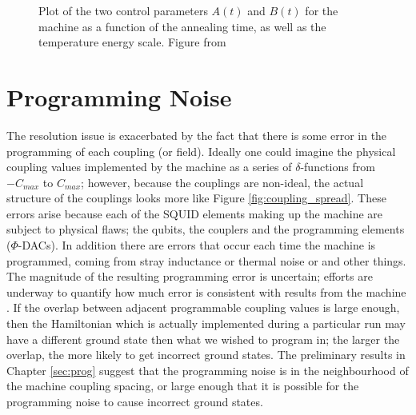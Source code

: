 \begin{figure}
	\caption[\machine Evolution Trajectory]{Plot of the two control parameters $A(t)$ and $B(t)$ for the \machine machine as a function of the annealing time, as well as the temperature energy scale.  Figure from \cite{pudenz}}
	\label{fig:trajectory}
\end{figure}

\section{Programming Noise}
\label{sec:noise}
The resolution issue is exacerbated by the fact that there is some error in the programming of each coupling (or field).  Ideally one could imagine the physical coupling values implemented by the machine as a series of $\delta$-functions from $-C_{max}$ to $C_{max}$; however, because the couplings are non-ideal, the actual structure of the couplings looks more like Figure \ref{fig:coupling_spread}.  These errors arise because each of the SQUID elements making up the machine are subject to physical flaws; the qubits, the couplers and the programming elements ($\Phi$-DACs). In addition there are errors that occur each time the machine is programmed, coming from stray inductance or thermal noise or and other things.  The magnitude of the resulting programming error is uncertain; efforts are underway to quantify how much error is consistent with results from the machine \cite{aaron}.  If the overlap between adjacent programmable coupling values is large enough, then the Hamiltonian which is actually implemented during a particular run may have a different ground state then what we wished to program in; the larger the overlap, the more likely to get incorrect ground states.  The preliminary results in Chapter \ref{sec:prog} suggest that the programming noise is in the neighbourhood of the machine coupling spacing, or large enough that it is possible for the programming noise to cause incorrect ground states.

